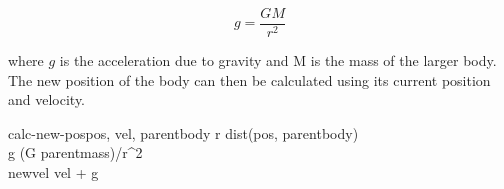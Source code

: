 \begin{equation}
	g = \frac{GM}{r^2}
\end{equation}

where $g$ is the acceleration due to gravity and M is the mass of the larger
body. The new position of the body can then be calculated using its current
position and velocity.

\begin{pseudocode}{calc-new-pos}{pos, vel, parentbody}
	r \GETS dist(pos, parentbody)	 \\
	g \GETS (G \cdot parentmass)/r^2 \\
	newvel \GETS vel + g \\
\end{pseudocode}
